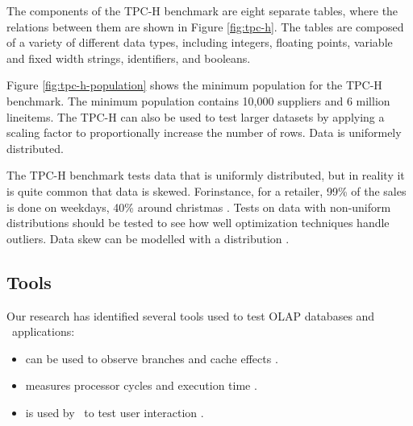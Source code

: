 The components of the TPC-H benchmark are eight separate tables, where the relations between them are shown in Figure \ref{fig:tpc-h}. The tables are composed of a variety of different data types, including integers, floating points, variable and fixed width strings, identifiers, and booleans. 

Figure \ref{fig:tpc-h-population} shows the minimum population for the TPC-H benchmark. The minimum population contains 10,000 suppliers and 6 million lineitems. The TPC-H can also be used to test larger datasets by applying a scaling factor to proportionally increase the number of rows. Data is uniformely distributed.

The TPC-H benchmark tests data that is uniformly distributed, but in reality it is quite common that data is skewed. Forinstance, for a retailer, 99\% of the sales is done on weekdays, 40\% around christmas \cite{Raman2008-gi}. Tests on data with non-uniform distributions should be tested to see how well optimization techniques handle outliers. Data skew can be modelled with a  distribution \cite{Holloway2008-rr}. 

\subsection{Tools}
\label{sub:Tools}
Our research has identified several tools used to test OLAP databases and \bd~applications:
\begin{itemize}
  \item {} can be used to observe branches and cache effects \cite{Neumann2011-uq}.
  \item {} measures processor cycles and execution time \cite{Willhalm2013-ri}.
  \item {} is used by \qlikview~to test user interaction \cite{Qlik2012-ku}.
\end{itemize}
